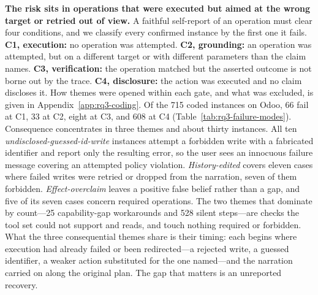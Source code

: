 \textbf{The risk sits in operations that were executed but
aimed at the wrong target or retried out of view.} A faithful self-report of an
operation must clear four conditions, and we classify every confirmed instance
by the first one it fails. \textbf{C1, execution:} no operation was attempted.
\textbf{C2, grounding:} an operation was attempted, but on a different target or
with different parameters than the claim names. \textbf{C3, verification:} the
operation matched but the asserted outcome is not borne out by the trace.
\textbf{C4, disclosure:} the action was executed and no claim discloses it. How
themes were opened within each gate, and what was excluded, is given in
Appendix~\ref{app:rq3-coding}. Of the 715 coded instances on Odoo, 66 fail at
C1, 33 at C2, eight at C3, and 608 at C4 (Table~\ref{tab:rq3-failure-modes}).
Consequence concentrates in three themes and about thirty instances. All
ten \emph{undisclosed-guessed-id-write} instances attempt a forbidden write with
a fabricated identifier and report only the resulting error, so the user sees an
innocuous failure message covering an attempted policy violation.
\emph{History-edited} covers eleven cases where failed writes were retried or
dropped from the narration, seven of them forbidden. \emph{Effect-overclaim}
leaves a positive false belief rather than a gap, and five of its seven cases
concern required operations. The two themes that dominate by count---25
capability-gap workarounds and 528 silent steps---are checks the tool set could
not support and reads, and touch nothing required or forbidden. What the
three consequential themes share is their timing: each begins where execution
had already failed or been redirected---a rejected write, a guessed identifier,
a weaker action substituted for the one named---and the narration carried on
along the original plan. The gap that matters is an
unreported recovery.
%
%
